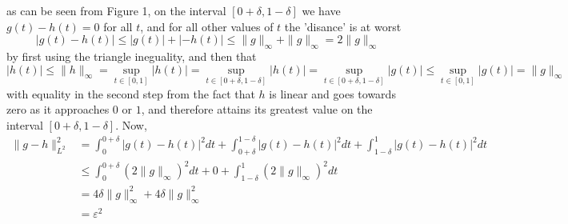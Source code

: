 \documentclass[../thesis.tex]{subfiles}
\begin{document}
as can be seen from Figure 1, on the interval $[0+\delta, 1-\delta]$ we have $g(t)-h(t)= 0$ for all $t$, and for all other values of $t$ the 'disance' is at worst 
\begin{equation*}
    \left|g(t)-h(t) \right| \leq |g(t)| + |-h(t)| \leq \|g \|_{\infty} + \|g \|_{\infty} = 2 \|g \|_{\infty}
\end{equation*}
by first using the triangle ineguality, and then that
\begin{equation*}
    |h(t)| \leq \|h\|_{\infty} = \sup_{t\in[0,1]} |h(t)| = \sup_{t\in[0+\delta, 1-\delta]} |h(t)| = \sup_{t\in[0+\delta, 1-\delta]} |g(t)| \leq \sup_{t\in[0, 1]} |g(t)| =\| g\|_{\infty}
\end{equation*}
with equality in the second step from the fact that $h$ is linear and goes towards zero as it approaches $0$ or $1$, and therefore attains its greatest value on the interval $[0+\delta,1-\delta]$. Now,
\begin{align*}
    \| g-h \|_{L^2}^2 &=  \int_0^{0+\delta} \left|g(t)-h(t) \right|^2dt + \int_{0+\delta}^{1-\delta} \left|g(t)-h(t) \right|^2dt +\int_{1-\delta}^{1} \left|g(t)-h(t) \right|^2dt\\ 
    &\leq \int_0^{0+\delta} (2 \| g\|_\infty)^2dt + 0 +\int_{1-\delta}^{1} (2 \| g\|_\infty)^2dt\\
    &=  4 \delta \| g\|_\infty^2 + 4 \delta \| g\|_\infty^2\\ 
    &= \varepsilon^2
\end{align*}
\end{document}
